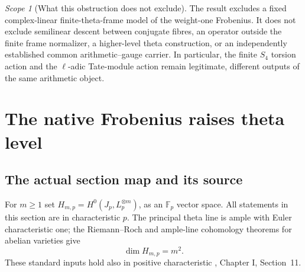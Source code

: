 \documentclass[11pt]{article}
\theoremstyle{definition}
\theoremstyle{remark}
\newtheorem{scope}[scope]{Scope}
\newcommand{\F}{\mathbb F}
\begin{document}
\begin{scope}[What this obstruction does not exclude]
The result excludes a fixed complex-linear finite-theta-frame model of the
weight-one Frobenius. It does not exclude semilinear descent between
conjugate fibres, an operator outside the finite frame normalizer, a
higher-level theta construction, or an independently established common
arithmetic--gauge carrier. In particular, the finite $S_4$ torsion action
and the $\ell$-adic Tate-module action remain legitimate, different
outputs of the same arithmetic object.
\end{scope}

\section{The native Frobenius raises theta level}
\label{sec:v5-level}

\subsection{The actual section map and its source}
For $m\ge1$ set $H_{m,p}=H^0(J_p,L_p^{\otimes m})$, as an $\F_p$ vector
space. All statements in this section are in characteristic $p$. The
principal theta line is ample with Euler characteristic one; the
Riemann--Roch and ample-line cohomology theorems for abelian varieties give
\begin{equation}
 \dim H_{m,p}=m^2.
 \label{eq:v5-theta-dimension}
\end{equation}
These standard inputs hold also in positive characteristic
\cite{MilneAV}, Chapter I, Section~11.
\end{document}
